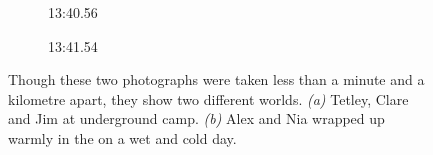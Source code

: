 	\begin{figure}[t]
	\checkoddpage \ifoddpage \forcerectofloat \else \forceversofloat \fi
		\centering
		\begin{subfigure}[t]{0.49\textwidth}
			\centering
			\caption{13:40.56}
			\label{jim tet clare xray}
		\end{subfigure}
	\hfill
		\begin{subfigure}[t]{0.49\textwidth}
			\centering
			\caption{13:41.54}\label{alex nia bivi}
		\end{subfigure}
		\caption{Though these two photographs were taken less than a minute and a kilometre apart, they show two different worlds.
  \textit{(a)} Tetley, Clare and Jim at underground camp. 
  \textit{(b)} Alex and Nia wrapped up warmly in the  on a wet and cold day. }
	\end{figure}



